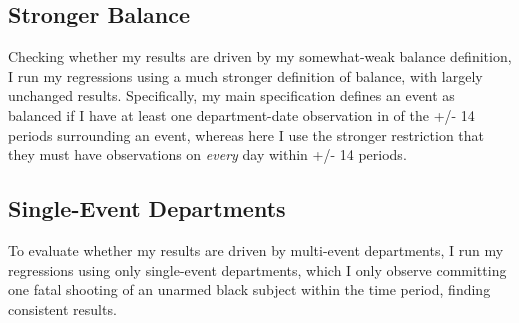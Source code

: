 \documentclass[12pt,a4paper]{article}
\begin{document}
\clearpage
\subsection{Stronger Balance}
Checking whether my results are driven by my somewhat-weak balance definition, I run my regressions using a much stronger definition of balance, with largely unchanged results. Specifically, my main specification defines an event as balanced if I have at least one department-date observation in of the +/- 14 periods surrounding an event, whereas here I use the stronger restriction that they must have observations on \emph{every} day within +/- 14 periods. \\

\begin{table}
	\begin{center}
		
		\caption[Volume Outcome Estimates, Stronger Balanced]{This table gives volume outcome coefficient estimates for the treatment effect following a shooting event both overall using equation \ref{eq1_DiD} in Panel A and by scrutiny level using equation \ref{eq3_DiDiD} in Panel B.}
		\label{full_DiD_volumes_A04}
	\end{center}
\end{table}

\begin{table}
	\begin{center}
		
		\caption[Rate Outcome Estimates, Stronger Balance]{This table gives rate outcome coefficient estimates for the treatment effect following a shooting event both overall using equation \ref{eq1_DiD} in Panel A and by scrutiny level using equation \ref{eq3_DiDiD} in Panel B.}
		\label{full_DiD_rates_A04}
	\end{center}
\end{table}

\clearpage
\subsection{Single-Event Departments}
To evaluate whether my results are driven by multi-event departments, I run my regressions using only single-event departments, which I only observe committing one fatal shooting of an unarmed black subject within the time period, finding consistent results. \\
\end{document}
